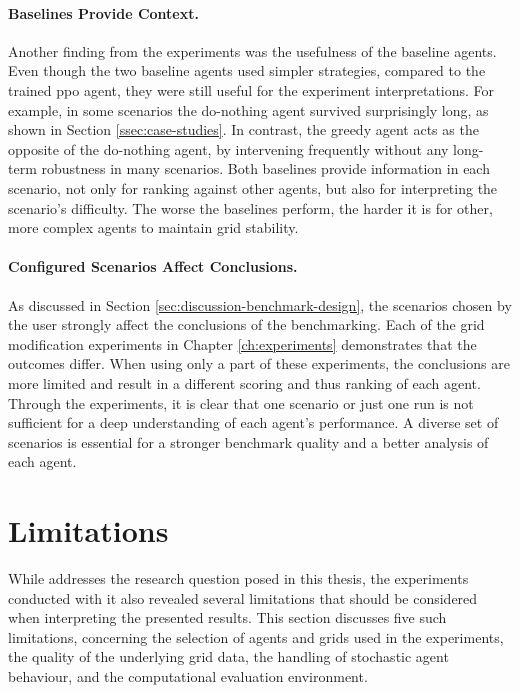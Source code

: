 \paragraph{Baselines Provide Context.}
Another finding from the experiments was the usefulness of the baseline agents. Even though the two baseline agents used simpler strategies, compared to the trained \ac{ppo} agent, they were still useful for the experiment interpretations. For example, in some scenarios the do-nothing agent survived surprisingly long, as shown in Section \ref{ssec:case-studies}. In contrast, the greedy agent acts as the opposite of the do-nothing agent, by intervening frequently without any long-term robustness in many scenarios. Both baselines provide information in each scenario, not only for ranking against other agents, but also for interpreting the scenario's difficulty. The worse the baselines perform, the harder it is for other, more complex agents to maintain grid stability.

\paragraph{Configured Scenarios Affect Conclusions.}
As discussed in Section \ref{sec:discussion-benchmark-design}, the scenarios chosen by the user strongly affect the conclusions of the benchmarking. Each of the grid modification experiments in Chapter \ref{ch:experiments} demonstrates that the outcomes differ. When using only a part of these experiments, the conclusions are more limited and result in a different scoring and thus ranking of each agent. Through the experiments, it is clear that one scenario or just one run is not sufficient for a deep understanding of each agent's performance. A diverse set of scenarios is essential for a stronger benchmark quality and a better analysis of each agent. 




\section{Limitations}\label{sec:discussion-limitations}
While \benchmark addresses the research question posed in this thesis, the experiments conducted with it also revealed several limitations that should be considered when interpreting the presented results. This section discusses five such limitations, concerning the selection of agents and grids used in the experiments, the quality of the underlying grid data, the handling of stochastic agent behaviour, and the computational evaluation environment.

